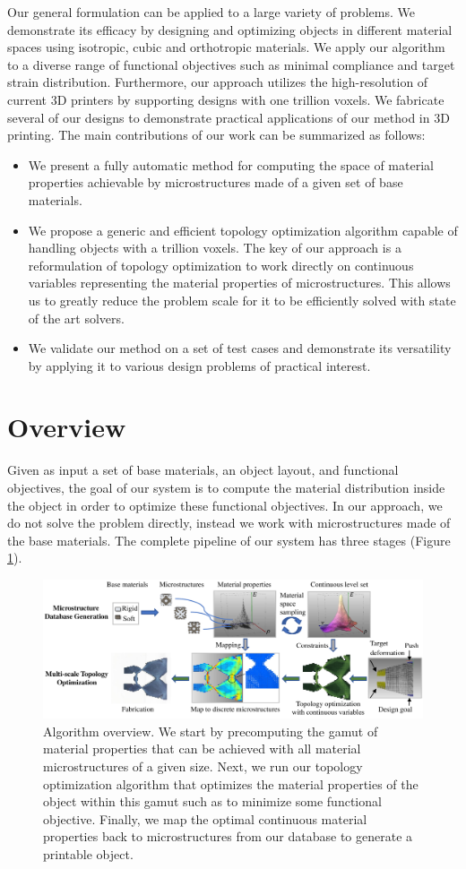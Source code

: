 Our general formulation can be applied to a large variety of problems. We demonstrate its efficacy by designing and optimizing objects in different material spaces using isotropic, cubic and orthotropic materials. We apply our algorithm to a diverse range of functional objectives such as minimal compliance and target strain distribution. 
Furthermore, our approach utilizes the high-resolution of current 3D printers by supporting designs with one trillion voxels.
We fabricate several of our designs to demonstrate practical applications of our method in 3D printing.
The main contributions of our work can be summarized as follows:
\begin{itemize}
	\item We present a fully automatic method for computing the space of material properties achievable by microstructures made of a given set of base materials.
	\item We propose a generic and efficient topology optimization algorithm capable of handling objects with a trillion voxels. The key of our approach is a reformulation of topology optimization to work directly on continuous variables representing the material properties of microstructures. This allows us to greatly reduce the problem scale for it to be efficiently solved with state of the art solvers.
	\item We validate our method on a set of test cases and demonstrate its versatility by applying it to various design problems of practical interest.
\end{itemize}
\section{Overview}
Given as input a set of base materials, an object layout, and functional objectives, the goal of our system is to compute the material distribution inside the object in order to optimize these functional objectives. In our approach, we do not solve the problem directly, instead we work with microstructures made of the base materials. The complete pipeline of our system has three stages (Figure \ref{fig:overview}).
\begin{figure}
	\centering
	\includegraphics[width=.95\linewidth]{figs/Overview.pdf}
	\caption{
		Algorithm overview. We start by precomputing the gamut of material properties that can be achieved with all material microstructures of a given size. Next, we run our topology optimization algorithm that optimizes the material properties of the object within this gamut such as to minimize some functional objective. Finally, we map the optimal continuous material properties back to microstructures from our database to generate a printable object.
	}
	\label{fig:overview}
\end{figure}
